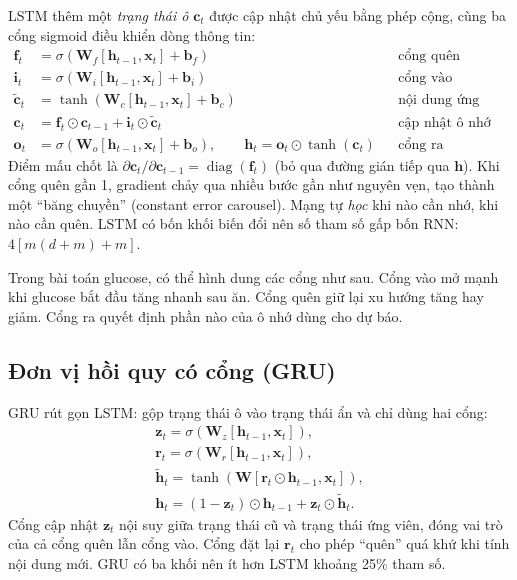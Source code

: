 LSTM \cite{hochreiter1997} thêm một \emph{trạng thái ô} $\mathbf c_t$ được cập nhật chủ yếu bằng phép cộng, cùng ba cổng sigmoid điều khiển dòng thông tin:
\begin{align}
\mathbf f_t &= \sigma(\mathbf W_f[\mathbf h_{t-1},\mathbf x_t] + \mathbf b_f) && \text{cổng quên} \nonumber\\
\mathbf i_t &= \sigma(\mathbf W_i[\mathbf h_{t-1},\mathbf x_t] + \mathbf b_i) && \text{cổng vào} \nonumber\\
\tilde{\mathbf c}_t &= \tanh(\mathbf W_c[\mathbf h_{t-1},\mathbf x_t] + \mathbf b_c) && \text{nội dung ứng viên} \label{eq:lstm}\\
\mathbf c_t &= \mathbf f_t\odot\mathbf c_{t-1} + \mathbf i_t\odot\tilde{\mathbf c}_t && \text{cập nhật ô nhớ} \nonumber\\
\mathbf o_t &= \sigma(\mathbf W_o[\mathbf h_{t-1},\mathbf x_t] + \mathbf b_o),\qquad \mathbf h_t = \mathbf o_t\odot\tanh(\mathbf c_t) && \text{cổng ra} \nonumber
\end{align}
Điểm mấu chốt là $\partial\mathbf c_t/\partial\mathbf c_{t-1} = \operatorname{diag}(\mathbf f_t)$ (bỏ qua đường gián tiếp qua $\mathbf h$). Khi cổng quên gần 1, gradient chảy qua nhiều bước gần như nguyên vẹn, tạo thành một ``băng chuyền'' (constant error carousel). Mạng tự \emph{học} khi nào cần nhớ, khi nào cần quên. LSTM có bốn khối biến đổi nên số tham số gấp bốn RNN: $4[m(d+m)+m]$.

Trong bài toán glucose, có thể hình dung các cổng như sau. Cổng vào mở mạnh khi glucose bắt đầu tăng nhanh sau ăn. Cổng quên giữ lại xu hướng tăng hay giảm. Cổng ra quyết định phần nào của ô nhớ dùng cho dự báo.

\subsection{Đơn vị hồi quy có cổng (GRU)}

GRU \cite{cho2014} rút gọn LSTM: gộp trạng thái ô vào trạng thái ẩn và chỉ dùng hai cổng:
\begin{equation}
\begin{gathered}
\mathbf z_t = \sigma(\mathbf W_z[\mathbf h_{t-1},\mathbf x_t]), \\
\mathbf r_t = \sigma(\mathbf W_r[\mathbf h_{t-1},\mathbf x_t]), \\
\tilde{\mathbf h}_t = \tanh(\mathbf W[\mathbf r_t\odot\mathbf h_{t-1},\mathbf x_t]), \\
\mathbf h_t = (1-\mathbf z_t)\odot\mathbf h_{t-1} + \mathbf z_t\odot\tilde{\mathbf h}_t .
\end{gathered}
\label{eq:gru}
\end{equation}
Cổng cập nhật $\mathbf z_t$ nội suy giữa trạng thái cũ và trạng thái ứng viên, đóng vai trò của cả cổng quên lẫn cổng vào. Cổng đặt lại $\mathbf r_t$ cho phép ``quên'' quá khứ khi tính nội dung mới. GRU có ba khối nên ít hơn LSTM khoảng 25\% tham số.


